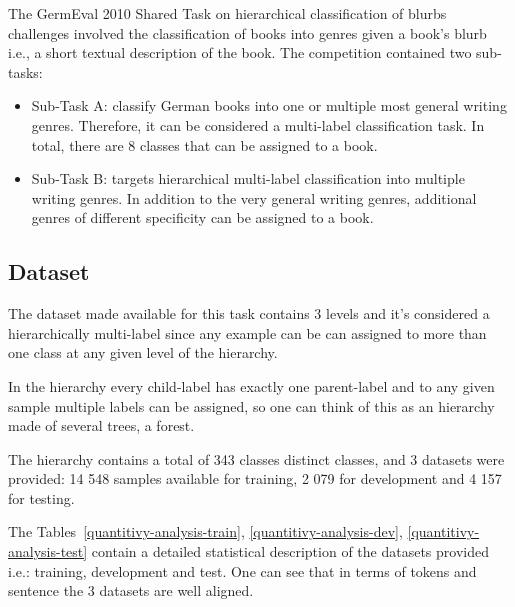 \documentclass[11pt,a4paper]{article}
\begin{document}
The GermEval 2010 Shared Task on hierarchical classification of blurbs challenges
involved the classification of books into genres given a book's blurb i.e., a
short textual description of the book. The competition contained two sub-tasks:

\begin{itemize}

\item Sub-Task A: classify German books into one or multiple most general writing
genres. Therefore, it can be considered a multi-label classification task. In
total, there are 8 classes that can be assigned to a book.

\item Sub-Task B: targets hierarchical multi-label classification into multiple
writing genres. In addition to the very general writing genres, additional
genres of different specificity can be assigned to a book.

\end{itemize}


\subsection{Dataset}

The dataset made available for this task contains 3 levels and it's considered
a hierarchically multi-label since any example can be can assigned to more than
one class at any given level of the hierarchy.

In the hierarchy every child-label has exactly one parent-label and to any given
sample multiple labels can be assigned, so one can think of this as an hierarchy
made of several trees, a forest.

The hierarchy contains a total of 343 classes distinct classes, and 3 datasets
were provided: 14 548 samples available for training, 2 079 for development and
4 157 for testing.

The Tables~\ref{quantitivy-analysis-train}, \ref{quantitivy-analysis-dev},
\ref{quantitivy-analysis-test}  contain a detailed statistical description of
the datasets provided i.e.: training, development and test. One can see that in
terms of tokens and sentence the 3 datasets are well aligned.
\end{document}
